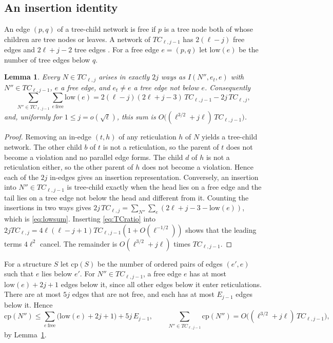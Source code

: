 \documentclass[11pt,a4paper]{article}
\newtheorem{lemma}[theorem]{Lemma}
\theoremstyle{definition}
\begin{document}
\subsection{An insertion identity}

An edge $(p,q)$ of a tree-child network is free if $p$ is a tree node both of whose children are tree nodes or leaves. A network of $TC_{\ell,j-1}$ has $2(\ell-j)$ free edges and $2\ell+j-2$ tree edges \cite[Prop.~5.1]{YZasym}. For a free edge $e=(p,q)$ let $\mathrm{low}(e)$ be the number of tree edges below $q$.

\begin{lemma}\label{lem:identity}
Every $N\in TC_{\ell,j}$ arises in exactly $2j$ ways as $I(N'',e_t,e)$ with $N''\in TC_{\ell,j-1}$, $e$ a free edge, and $e_t\ne e$ a tree edge not below $e$. Consequently \cite[Prop.~5.3]{YZasym}
\begin{equation}\label{eq:lowsum}
\sum_{N''\in TC_{\ell,j-1}}\sum_{e\ \mathrm{free}}\mathrm{low}(e)=2(\ell-j)(2\ell+j-3)\,TC_{\ell,j-1}-2j\,TC_{\ell,j},
\end{equation}
and, uniformly for $1\le j=o(\sqrt\ell)$, this sum is $O\bigl((\ell^{3/2}+j\ell)\,TC_{\ell,j-1}\bigr)$.
\end{lemma}

\begin{proof}
Removing an in-edge $(t,h)$ of any reticulation $h$ of $N$ yields a tree-child network. The other child $b$ of $t$ is not a reticulation, so the parent of $t$ does not become a violation and no parallel edge forms. The child $d$ of $h$ is not a reticulation either, so the other parent of $h$ does not become a violation. Hence each of the $2j$ in-edges gives an insertion representation. Conversely, an insertion into $N''\in TC_{\ell,j-1}$ is tree-child exactly when the head lies on a free edge and the tail lies on a tree edge not below the head and different from it. Counting the insertions in two ways gives $2j\,TC_{\ell,j}=\sum_{N''}\sum_e(2\ell+j-3-\mathrm{low}(e))$, which is \eqref{eq:lowsum}. Inserting \eqref{eq:TCratio} into $2jTC_{\ell,j}=4\ell(\ell-j+1)TC_{\ell,j-1}(1+O(\ell^{-1/2}))$ shows that the leading terms $4\ell^2$ cancel. The remainder is $O(\ell^{3/2}+j\ell)$ times $TC_{\ell,j-1}$.
\end{proof}

For a structure $S$ let $\mathrm{cp}(S)$ be the number of ordered pairs of edges $(e',e)$ such that $e$ lies below $e'$. For $N''\in TC_{\ell,j-1}$, a free edge $e$ has at most $\mathrm{low}(e)+2j+1$ edges below it, since all other edges below it enter reticulations. There are at most $5j$ edges that are not free, and each has at most $E_{j-1}$ edges below it. Hence
\begin{equation}\label{eq:cpbound}
\mathrm{cp}(N'')\le\sum_{e\ \mathrm{free}}\bigl(\mathrm{low}(e)+2j+1\bigr)+5j\,E_{j-1},\qquad
\sum_{N''\in TC_{\ell,j-1}}\mathrm{cp}(N'')=O\bigl((\ell^{3/2}+j\ell)\,TC_{\ell,j-1}\bigr),
\end{equation}
by Lemma~\ref{lem:identity}.
\end{document}
